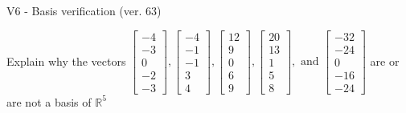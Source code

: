 \begin{exercise}
  \begin{exerciseTitle}V6 - Basis verification (ver. 63)\end{exerciseTitle}
  \begin{exerciseStatement}
    Explain why the vectors \(\left[\begin{array}{r}
-4 \\
-3 \\
0 \\
-2 \\
-3
\end{array}\right] , \left[\begin{array}{r}
-4 \\
-1 \\
-1 \\
3 \\
4
\end{array}\right] , \left[\begin{array}{r}
12 \\
9 \\
0 \\
6 \\
9
\end{array}\right] , \left[\begin{array}{r}
20 \\
13 \\
1 \\
5 \\
8
\end{array}\right] , \text{ and } \left[\begin{array}{r}
-32 \\
-24 \\
0 \\
-16 \\
-24
\end{array}\right]\) are or are not a basis of \(\mathbb{R}^5\)	



\end{exerciseStatement}
\end{exercise}
